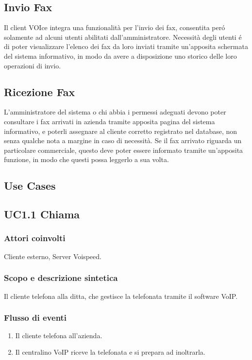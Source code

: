 \subsection{Invio Fax}
Il client VOIce integra una funzionalit\`a per l'invio dei fax, consentita per\'o solamente ad alcuni utenti abilitati dall'amministratore. Necessit\`a degli utenti \'e di poter visualizzare l'elenco dei fax da loro inviati tramite un'apposita schermata del sistema informativo, in modo da avere a disposizione uno storico delle loro operazioni di invio.

\subsection{Ricezione Fax}
L'amministratore del sistema o chi abbia i permessi adeguati devono poter consultare i fax arrivati in azienda tramite apposita pagina del sistema informativo, e poterli assegnare al cliente corretto registrato nel database, non senza qualche nota a margine in caso di necessit\`a. Se il fax arrivato riguarda un particolare commerciale, questo deve poter essere informato tramite un'apposita funzione, in modo che questi possa leggerlo a sua volta.

\subsection{Use Cases}
\subsection*{UC1.1 Chiama}
\subsubsection*{Attori coinvolti} Cliente esterno, Server Voispeed.
\subsubsection*{Scopo e descrizione sintetica}
Il cliente telefona alla ditta, che gestisce la telefonata tramite il software VoIP.
\subsubsection*{Flusso di eventi}
\begin{enumerate}
\item Il cliente telefona all'azienda.
\item Il centralino VoIP riceve la telefonata e si prepara ad inoltrarla.
\end{enumerate}
